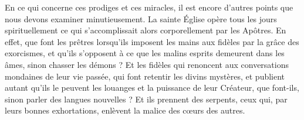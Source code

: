 En ce qui concerne ces prodiges et ces miracles, il est encore d’autres points que nous devons examiner minutieusement. La sainte Église opère tous les jours spirituellement ce qui s’accomplissait alors corporellement par les Apôtres. En effet, que font les prêtres lorsqu’ils imposent les mains aux fidèles par la grâce des exorcismes, et qu’ils s’opposent à ce que les malins esprits demeurent dans les âmes, sinon chasser les démons ? Et les fidèles qui renoncent aux conversations mondaines de leur vie passée, qui font retentir les divins mystères, et publient autant qu’ils le peuvent les louanges et la puissance de leur Créateur, que font-ils, sinon parler des langues nouvelles ? Et ils prennent des serpents, ceux qui, par leurs bonnes exhortations, enlèvent la malice des cœurs des autres.